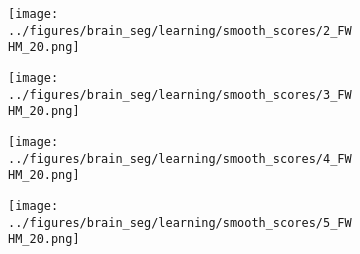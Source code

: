 \begin{figure}[h!]
\begin{subfigure}{0.16\textwidth}
		\centering
		\texttt{[image: ../figures/brain\_seg/learning/smooth\_scores/2\_FWHM\_20.png]}
		\label{fig:7}
	\end{subfigure}
	\begin{subfigure}{0.16\textwidth}
		\centering
		\texttt{[image: ../figures/brain\_seg/learning/smooth\_scores/3\_FWHM\_20.png]}
		\label{fig:8}
	\end{subfigure}
	\begin{subfigure}{0.16\textwidth}
		\centering
		\texttt{[image: ../figures/brain\_seg/learning/smooth\_scores/4\_FWHM\_20.png]}
		\label{fig:9}
	\end{subfigure}
	\begin{subfigure}{0.16\textwidth}
		\centering
		\texttt{[image: ../figures/brain\_seg/learning/smooth\_scores/5\_FWHM\_20.png]}
		\label{fig:10}
	\end{subfigure}
	\caption{}
	\label{fig:brain3}
\end{figure}
\newpage
